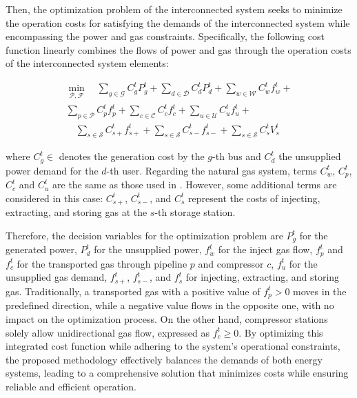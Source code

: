 Then, the optimization problem of the interconnected system seeks to minimize the operation costs for satisfying the demands of the interconnected system while encompassing the power and gas constraints. Specifically, the following cost function linearly combines the flows of power and gas through the operation costs of the interconnected system elements:

\begin{equation} \label{eq:obj_func_integrated}
\begin{split}
\min_{\mathcal{P}, \mathcal{F}} \quad  \sum_{g \in \mathcal{G}} C_{g}^t {P_{g}^t} + \sum_{d \in \mathcal{D}} C_{d}^t {P_{d}^t} +  \sum_{w \in \mathcal{W}} C_{w}^t {f_{w}^t} + \\ \sum_{p \in \mathcal{P}} C_{p}^t {f_{p}^t}  + \sum_{c \in \mathcal{C}} C_{c}^t {f_{c}^t} + \sum_{u \in \mathcal{U}} C_{u}^{t} {f_{u}^{t}} + \\ \quad \sum_{s \in \mathcal{S}} C_{s+}^{t} {f_{s+}^{t}}  + \sum_{s \in \mathcal{S}} C_{s-}^{t} {f_{s-}^{t}} + \sum_{s \in \mathcal{S}} C_{s}^{t} {V_{s}^{t}}
\end{split}
\end{equation}

\noindent where $C_g^t \in $ denotes the generation cost by the $g$-th bus and $C_d^t$ the unsupplied power demand for the $d$-th user. Regarding the natural gas system, terms $C_w^t$, $C_p^t$, $C_c^t$ and $C_u^t$ are the same as those used in . However, some additional terms are considered in this case: $C_{s+}^t$, $C_{s-}^t$, and $C_{s}^t$ represent the costs of injecting, extracting, and storing gas at the $s$-th storage station.

Therefore, the decision variables for the optimization problem are $P_g^t$ for the generated power, $P_d^t$ for the unsupplied power, $f_w^t$ for the inject gas flow, $f_p^t$ and $f_c^t$ for the transported gas through pipeline $p$ and compressor $c$, $f_u^t$ for the unsupplied gas demand, $f_{s+}^t$, $f_{s-}^t$, and $f_{s}^t$ for injecting, extracting, and storing gas. Traditionally, a transported gas with a positive value of $ f_ { p } ^t>0 $ moves in the predefined direction, while a negative value flows in the opposite one, with no impact on the optimization process. On the other hand, compressor stations solely allow unidirectional gas flow, expressed as $f_{c}^t\geq0$. By optimizing this integrated cost function while adhering to the system's operational constraints, the proposed methodology effectively balances the demands of both energy systems, leading to a comprehensive solution that minimizes costs while ensuring reliable and efficient operation.

